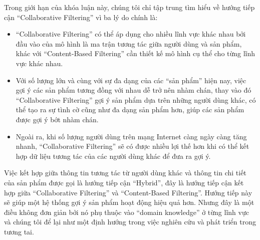 
Trong giới hạn của khóa luận này, chúng tôi chỉ tập trung tìm hiểu về hướng tiếp cận ``Collaborative Filtering'' 
vì ba lý do chính là:
\begin{itemize}
\item ``Collaborative Filtering'' có thể áp dụng cho nhiều lĩnh vực khác nhau bởi đầu vào của mô hình là ma trận tương tác giữa người dùng và sản phẩm, khác với ``Content-Based Filtering'' cần thiết kế mô hình cụ thể cho từng lĩnh vực khác nhau.
\item Với số lượng lớn và cùng với sự đa dạng của các ``sản phẩm'' hiện nay, việc gợi ý các sản phẩm tương đồng với nhau dễ trở nên nhàm chán, thay vào đó ``Collaborative Filtering'' gợi ý sản phẩm dựa trên những người dùng khác, có thể tạo ra sự tình cờ cũng như đa dạng sản phẩm hơn, giúp các sản phẩm được gợi ý bớt nhàm chán.
\item Ngoài ra, khi số lượng người dùng trên mạng Internet càng ngày càng tăng nhanh, ``Collaborative Filtering'' 
sẽ có được nhiều lợi thế hơn khi có thể kết hợp dữ liệu tương tác của các người dùng khác để đưa ra gợi ý.
\end{itemize}

Việc kết hợp giữa thông tin tương tác từ người dùng khác và thông tin chi tiết của sản phẩm được gọi là hướng tiếp cận ``Hybrid'', đây là hướng tiếp cận kết hợp giữa ``Collaborative Filtering'' và ``Content-Based Filtering''.
Hướng tiếp này sẽ giúp một hệ thống gợi ý sản phẩm hoạt động hiệu quả hơn. Nhưng đây là một điều không đơn giản bởi nó phụ thuộc vào ``domain knowledge'' ở từng lĩnh vực và chúng tôi để lại như một định hướng trong việc nghiên cứu và phát triển trong tương tai.

